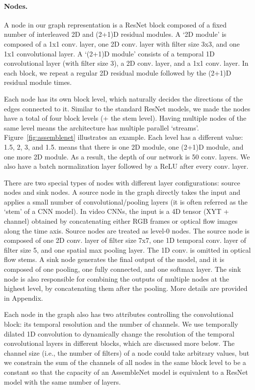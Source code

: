 \documentclass{article} \usepackage{iclr2020_conference,times}
\begin{document}
\vspace{-5pt}
\paragraph{Nodes.}

A node in our graph representation is a ResNet block composed of a fixed number of interleaved 2D and (2+1)D residual modules. 
A `2D module' is composed of a 1x1 conv. layer, one 2D conv. layer with filter size 3x3, and one 1x1 convolutional layer.
A `(2+1)D module' consists of a temporal 1D convolutional layer (with filter size 3), a 2D conv. layer, and a 1x1 conv. layer. In each block, we repeat a regular 2D residual module followed by the (2+1)D residual module  times.

Each node has its own block level, which naturally decides the directions of the edges connected to it. Similar to the standard ResNet models, we made the nodes have a total of four block levels (+ the stem level). Having multiple nodes of the same level means the architecture has multiple parallel `streams'. Figure~\ref{fig:assemblenet} illustrates an example. Each level has a different  value: 1.5, 2, 3, and 1.5.  means that there is one 2D module, one (2+1)D module, and one more 2D module. As a result, the depth of our network is 50 conv. layers. We also have a batch normalization layer followed by a ReLU after every conv. layer.

There are two special types of nodes with different layer configurations: source nodes and sink nodes. A source node in the graph directly takes the input and applies a small number of convolutional/pooling layers (it is often referred as the `stem' of a CNN model). In video CNNs, the input is a 4D tensor (XYT + channel) obtained by concatenating either RGB frames or optical flow images along the time axis.  Source nodes are treated as level-0 nodes.
The source node is composed of one 2D conv. layer of filter size 7x7, one 1D temporal conv. layer of filter size 5, and one spatial max pooling layer. The 1D conv. is omitted in optical flow stems. A sink node generates the final output of the model, and it is composed of one pooling, one fully connected, and one softmax layer. The sink node is also responsible for combining the outputs of multiple nodes at the highest level, by concatenating them after the pooling. More details are provided in Appendix.

Each node in the graph also has two attributes controlling the convolutional block: its temporal resolution and the number of channels. We use temporally dilated 1D convolution to dynamically change the resolution of the temporal convolutional layers in different blocks, which are discussed more below. The channel size (i.e., the number of filters) of a node could take arbitrary values, but we constrain the sum of the channels of all nodes in the same block level to be a constant so that the capacity of an AssembleNet model is equivalent to a ResNet model with the same number of layers.
\end{document}
